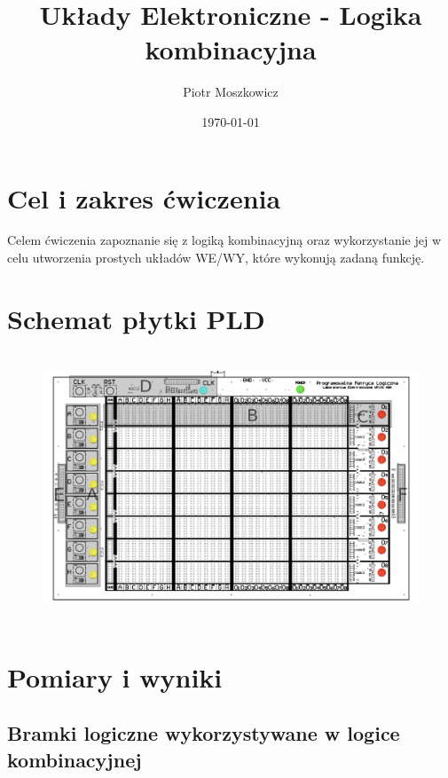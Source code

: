 \documentclass[a4paper,12pt]{article}
\begin{document}
\title{Układy Elektroniczne - Logika kombinacyjna}
\author{Piotr Moszkowicz} 
\date{\today}
\maketitle
{}

\newpage
\begin{justify}
\tableofcontents
\newpage
{}

\section{Cel i zakres ćwiczenia}

Celem ćwiczenia zapoznanie się z logiką kombinacyjną oraz wykorzystanie jej w celu utworzenia prostych układów WE/WY, które wykonują zadaną funkcję.

\section{Schemat płytki PLD}

\begin{figure}[h!]
\centering
\includegraphics[width=15cm, height=8cm]{pld}
\end{figure}

\section{Pomiary i wyniki}

\subsection{Bramki logiczne wykorzystywane w logice kombinacyjnej}


\end{justify}
\end{document}
